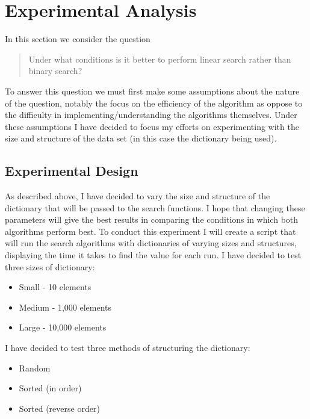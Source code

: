 \documentclass{article}
\begin{document}
\section{Experimental Analysis}
\label{sec:initialExperiments}

In this section we consider the question
	\begin{quote}
	Under what conditions is it better to perform linear search rather than binary search?
	\end{quote}
To answer this question we must first make some assumptions about the nature of the question, notably the focus on the efficiency of the algorithm as oppose to the difficulty in implementing/understanding the algorithms themselves. Under these assumptions I have decided to focus my efforts on experimenting with the size and structure of the data set (in this case the dictionary being used). 

\subsection{Experimental Design}

As described above, I have decided to vary the size and structure of the dictionary that will be passed to the search functions. I hope that changing these parameters will give the best results in comparing the conditions in which both algorithms perform best. To conduct this experiment I will create a script that will run the search algorithms with dictionaries of varying sizes and structures, displaying the time it takes to find the value for each run. 
\newline\newline\newline
I have decided to test three sizes of dictionary:
\begin{itemize}
  \item Small - 10 elements
  \item Medium - 1,000 elements
  \item Large - 10,000 elements
\end{itemize}
\newline\newline
I have decided to test three methods of structuring the dictionary:
\begin{itemize}
  \item Random
  \item Sorted (in order)
  \item Sorted (reverse order)
\end{itemize}
\newline\newline
\end{document}
